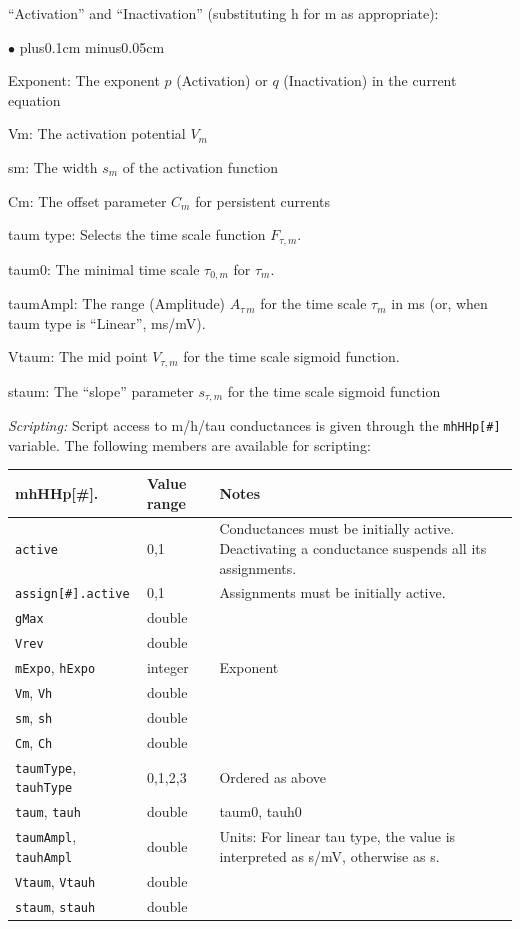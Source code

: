 \documentclass{article}
\newenvironment{myitem}{\begin{list}{$\bullet$}{\setlength{\leftmargin}{1.1em}
\itemsep0.1cm plus0.1cm minus0.05cm
\listparindent0cm
\addtolength{\labelsep}{0.5\labelsep}
\setlength{\labelwidth}{0.8em}
\setlength{\leftmargin}{\labelwidth}
\addtolength{\leftmargin}{\labelsep}
}}{\end{list}}
\begin{document}
\noindent
``Activation'' and ``Inactivation'' (substituting h for m as appropriate): 
\begin{myitem}
\item Exponent: The exponent $p$ (Activation) or $q$ (Inactivation) in the current equation
\item Vm: The activation potential $V_m$
\item sm: The width $s_m$ of the activation function
\item Cm: The offset parameter $C_m$ for persistent currents
\item taum type: Selects the time scale function $F_{\tau,m}$.
\item taum0: The minimal time scale $\tau_{0,m}$ for $\tau_m$.
\item taumAmpl: The range (Amplitude) $A_{\tau\,m}$ for the time scale $\tau_m$ in ms
 (or, when taum type is ``Linear'', ms/mV).
\item Vtaum: The mid point $V_{\tau,m}$ for the time scale sigmoid function.
\item staum: The ``slope'' parameter $s_{\tau,m}$ for the time scale
sigmoid function  
\end{myitem}

\noindent
\emph{Scripting:} Script access to m/h/tau conductances is given through the \texttt{mhHHp[\#]} variable.
The following members are available for scripting: \\
\begin{tabularx}{\linewidth}{|ll|X|}
	\hline
	{\bf mhHHp[\#].\textvisiblespace} & {\bf Value range} & {\bf Notes} \\
	\hline
	\texttt{active} & 0,1 & Conductances must be initially active. Deactivating a conductance suspends all
	its assignments. \\
	\texttt{assign[\#].active} & 0,1 & Assignments must be initially active. \\
	\texttt{gMax} & double & \\
	\texttt{Vrev} & double & \\
	\texttt{mExpo}, \texttt{hExpo} & integer & Exponent \\
	\texttt{Vm}, \texttt{Vh} & double & \\
	\texttt{sm}, \texttt{sh} & double & \\
	\texttt{Cm}, \texttt{Ch} & double & \\
	\texttt{taumType}, \texttt{tauhType} & 0,1,2,3 & Ordered as above \\
	\texttt{taum}, \texttt{tauh} & double & taum0, tauh0\\
	\texttt{taumAmpl}, \texttt{tauhAmpl} & double & Units: For linear tau type, the value is
	interpreted as s/mV, otherwise as s.\\
	\texttt{Vtaum}, \texttt{Vtauh} & double & \\
	\texttt{staum}, \texttt{stauh} & double & \\
	\hline
\end{tabularx}
\end{document}
